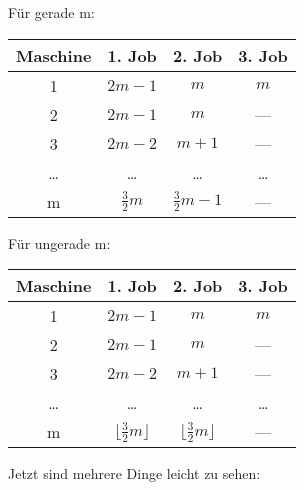 \documentclass[a4paper]{article}
\begin{document}
	\begin{multicols}{2}
		Für gerade m: \n
		\begin{tabular}{|c||c|c|c|} \hline
			Maschine	&	1. Job 	&	2. Job	&	3. Job	\\ \hline \hline
			1			&	$2m-1$	&	$m$		&	$m$		\\ \hline
			2			&	$2m-1$	&	$m$		&	---		\\ \hline
			3			&	$2m-2$	&	$m+1$	&	---		\\ \hline
			\dots		&	\dots	&	\dots	&	\dots	\\ \hline
			m			&	$\frac{3}{2}m$ 	&	$\frac{3}{2}m-1$ 	&	---	\\ \hline
		\end{tabular}
		
		Für ungerade m: \n
		\begin{tabular}{|c||c|c|c|} \hline
			Maschine	&	1. Job 	&	2. Job	&	3. Job	\\ \hline \hline
			1			&	$2m-1$	&	$m$		&	$m$		\\ \hline
			2			&	$2m-1$	&	$m$		&	---		\\ \hline
			3			&	$2m-2$	&	$m+1$	&	---		\\ \hline
			\dots		&	\dots	&	\dots	&	\dots	\\ \hline
			m			&	$\lfloor \frac{3}{2}m \rfloor$	&	$\lfloor \frac{3}{2}m \rfloor$	&	---	\\ \hline
		\end{tabular}
	\end{multicols}
	Jetzt sind mehrere Dinge leicht zu sehen:
\end{document}
